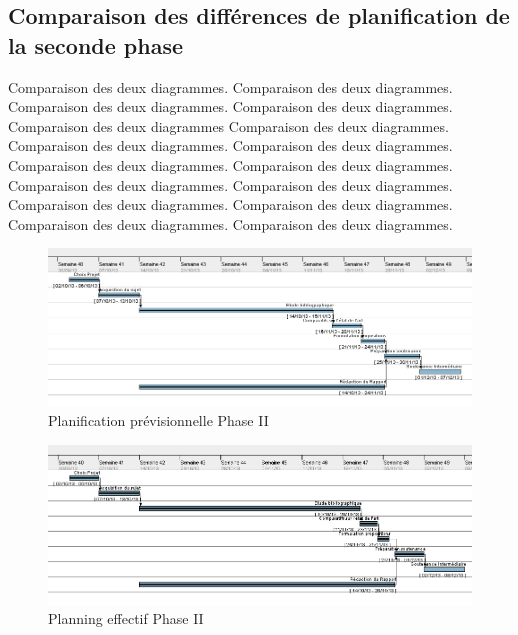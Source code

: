 \documentclass[11pt, french]{report-rd-info}
\begin{document}
\subsection{Comparaison des différences de planification de la seconde phase}

Comparaison des deux diagrammes. Comparaison des deux diagrammes. Comparaison des deux diagrammes. Comparaison des deux diagrammes. Comparaison des deux diagrammes  Comparaison des deux diagrammes. Comparaison des deux diagrammes. Comparaison des deux diagrammes. Comparaison des deux diagrammes. Comparaison des deux diagrammes. Comparaison des deux diagrammes. Comparaison des deux diagrammes. Comparaison des deux diagrammes. Comparaison des deux diagrammes. Comparaison des deux diagrammes. Comparaison des deux diagrammes.



\begin{figure}
	\centering
		\includegraphics[width=1\textwidth]{Gantts/p2_previsionnel}
	\caption{Planification prévisionnelle Phase II}
	\label{fig:PlanningPrevisionnel2}
\end{figure}
\begin{figure}
	\centering
		\includegraphics[width=1\textwidth]{Gantts/p2_effectif}
	\caption{Planning effectif Phase II}
	\label{fig:PlanningEffectif2}
\end{figure}
\end{document}
